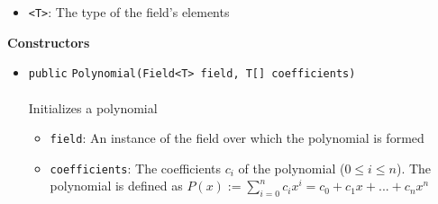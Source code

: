 \begin{itemize}
\item \lstinline|<T>|: The type of the field's elements
\end{itemize}



\textbf{\sffamily Constructors}
\begin{itemize}
\item \lstinline|public| \lstinline|Polynomial|\lstinline|(Field<T> field, T[] coefficients)|\\ \\[-0.6em]
Initializes a polynomial
\begin{itemize}
\item \lstinline|field|: An instance of the field over which the polynomial is formed
\item \lstinline|coefficients|: The coefficients $c_i$ of the polynomial ($0 \leq i \leq n$).
 The polynomial is defined as $P(x) := \sum_{i=0}^n c_i x^i = c_0 + c_1
 x + ... + c_n x^n$
\end{itemize}



\end{itemize}


